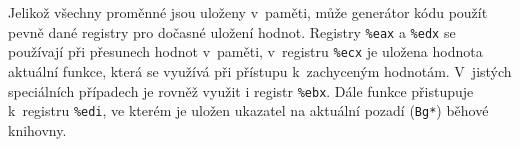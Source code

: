 Jelikož všechny proměnné jsou uloženy v~paměti, může generátor kódu použít pevně
dané registry pro dočasné uložení hodnot. Registry \texttt{\%eax} a
\texttt{\%edx} se používají při přesunech hodnot v~paměti, v~registru
\texttt{\%ecx} je uložena hodnota aktuální funkce, která se využívá při
přístupu k~zachyceným hodnotám.  V~jistých speciálních případech je rovněž
využit i registr \texttt{\%ebx}. Dále funkce přistupuje k~registru
\texttt{\%edi}, ve kterém je uložen ukazatel na aktuální pozadí
(\texttt{Bg*}) běhové knihovny.
